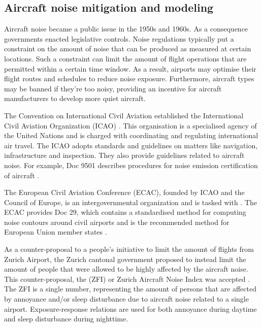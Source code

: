 \subsection*{Aircraft noise mitigation and modeling}
Aircraft noise became a public issue in the 1950s and 1960s. As a consequence
governments enacted legislative controls. Noise regulations typically put a
constraint on the amount of noise that can be produced as measured at certain
locations. Such a constraint can limit the amount of flight operations that are
permitted within a certain time window. As a result, airports may optimise their
flight routes and schedules to reduce noise exposure. Furthermore, aircraft
types may be banned if they're too noisy, providing an incentive for
aircraft manufacturers to develop more quiet aircraft.


The Convention on International Civil Aviation established the International
Civil Aviation Organization (ICAO) \cite{ICAO2017}. This organisation is a
specialised agency of the United Nations and is charged with coordinating and
regulating international air travel. The ICAO adopts standards and guidelines on
matters like navigation, infrastructure and inspection. They also provide
guidelines related to aircraft noise. For example, Doc 9501 describes procedures
for noise emission certification of aircraft \cite{ICAO_9501}.


The European Civil Aviation Conference (ECAC), founded by ICAO and the Council
of Europe, is an intergovernmental organization and is tasked with  \cite{ECAC2017}. The ECAC provides Doc 29, which
contains a standardised method for computing noise contours around civil
airports \cite{Doc29_fourth_2016} and is the recommended method for European
Union member states \cite{directive_2002_49_ec}.

As a counter-proposal to a people's initiative to limit the amount of flights
from Zurich Airport, the Zurich cantonal government proposed to instead limit
the amount of people that were allowed to be highly affected by the aircraft
noise. This counter-proposal, the  (ZFI) or Zurich
Aircraft Noise Index was accepted \cite{Schaffer2012}. The ZFI is a single
number, representing the amount of persons that are affected by annoyance and/or
sleep disturbance due to aircraft noise related to a single airport.
Exposure-response relations are used for both annoyance during daytime and sleep
disturbance during nighttime.

